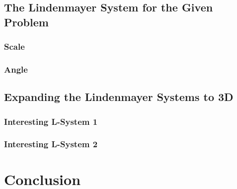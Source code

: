 \subsection{The Lindenmayer System for the Given Problem}
\subsubsection{Scale}
\subsubsection{Angle}

\subsection{Expanding the Lindenmayer Systems to 3D}
\subsubsection{Interesting L-System 1}
\subsubsection{Interesting L-System 2}

\section{Conclusion}

